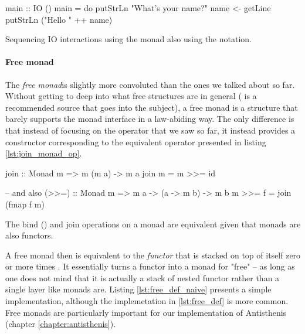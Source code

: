   \begin{code}
\begin{haskellcode}
main :: IO ()
main = do
  putStrLn "What's your name?"
  name <- getLine
  putStrLn ("Hello " ++ name)
\end{haskellcode}
    \caption{\label{lst:io_sugar_example}Sequencing IO interactions
      using the  monad also using the  notation.}
  \end{code}

  \paragraph{Free monad}

  The \emph{free monad}is slightly more convoluted than the ones we talked
  about so far. Without getting to deep into what free structures are in
  general (\cite{bartoszmilewskiDaoFunctionalProgramming} is a
  recommended source that goes into the subject), a free monad is a structure that barely supports
  the monad interface in a law-abiding way. The only difference is that
  instead of focusing on the \hask{>>=} operator that we saw so far, it
  instead provides a constructor corresponding to the equivalent operator
   presented in listing \ref{lst:join_monad_op}.

  \begin{code}
\begin{haskellcode}
join :: Monad m => m (m a) -> m a
join m = m >>= id

-- and also
(>>=) :: Monad m => m a -> (a -> m b) -> m b
m >>= f = join (fmap f m)
\end{haskellcode}

    \caption{\label{lst:join_monad_op}The bind (\hask{>>=}) and join
      operations on a monad are equivalent given that monads are also
      functors.}
  \end{code}

  A free monad  then is equivalent to the \emph{functor}
   that is stacked on top of itself zero or more times . It essentially turns a functor into a monad for
  "free" -- as long as one does not mind that it is actually a stack of nested
  functor rather than a single layer like monads are. Listing
  \ref{lst:free_def_naive} presents a simple implementation, although
  the implemetation in \ref{lst:free_def} is more common. Free monads
  are particularly important for our implementation of Antisthenis (chapter \ref{chapter:antisthenis}).

